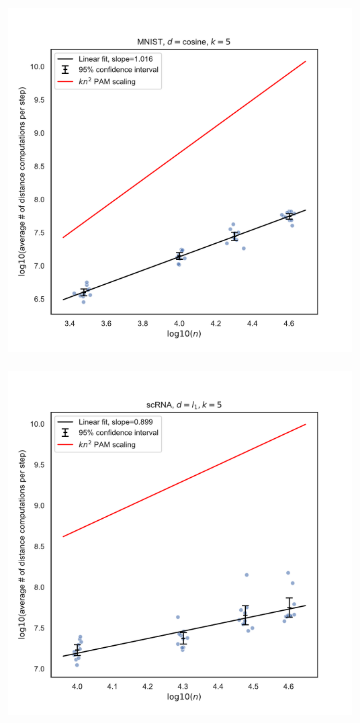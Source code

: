\begin{figure}[ht]
\begin{subfigure}{.33\textwidth}
  \centering
  \includegraphics[width=\linewidth]{figures/MNIST-cosine-k5.pdf}  
  \caption{}
  \label{fig:scaling1}
\end{subfigure}
\begin{subfigure}{.33\textwidth}
  \centering
  \includegraphics[width=\linewidth]{figures/SCRNA-L1-k5.pdf}   

\end{subfigure}
\end{figure}

